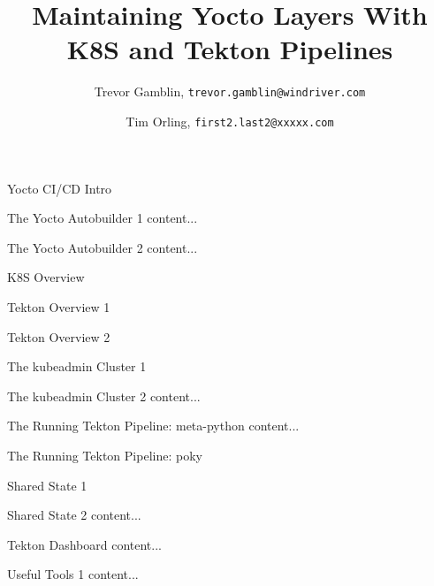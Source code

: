 \documentclass{beamer}
\author{
	Trevor Gamblin, \texttt{trevor.gamblin@windriver.com}\\
	\and
	Tim Orling, \texttt{first2.last2@xxxxx.com}
}
\title{Maintaining Yocto Layers With K8S and Tekton Pipelines}
\begin{document}
\begin{frame}[plain]
    \maketitle
\end{frame}
\begin{frame}{Yocto CI/CD Intro}
\end{frame}

\begin{frame}{The Yocto Autobuilder 1}
	content...
\end{frame}

\begin{frame}{The Yocto Autobuilder 2}
	content...
\end{frame}

\begin{frame}{K8S Overview}
\end{frame}

\begin{frame}{Tekton Overview 1}
\end{frame}

\begin{frame}{Tekton Overview 2}
\end{frame}

\begin{frame}{The kubeadmin Cluster 1}
\end{frame}

\begin{frame}{The kubeadmin Cluster 2}
	content...
\end{frame}

\begin{frame}{The Running Tekton Pipeline: meta-python}
	content...
\end{frame}

\begin{frame}{The Running Tekton Pipeline: poky}
\end{frame}

\begin{frame}{Shared State 1}
\end{frame}

\begin{frame}{Shared State 2}
	content...
\end{frame}

\begin{frame}{Tekton Dashboard}
	content...
\end{frame}

\begin{frame}{Useful Tools 1}
	content...
\end{frame}
\end{document}
